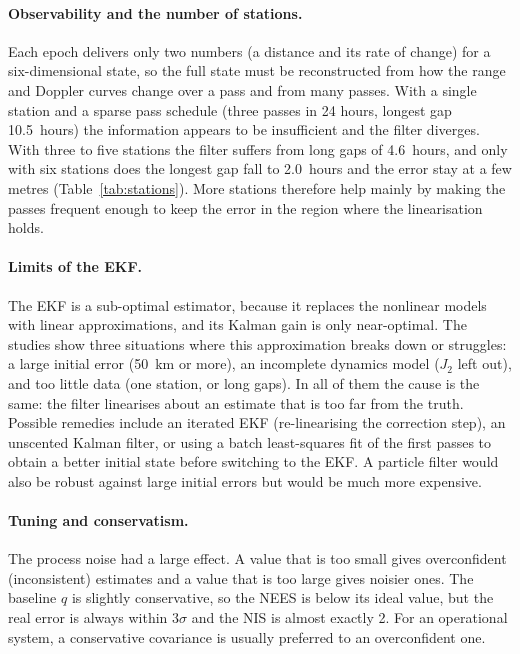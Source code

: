 \documentclass[11pt,a4paper]{article}
\begin{document}
\paragraph{Observability and the number of stations.}
Each epoch delivers only two numbers (a distance and its rate of change) for a six-dimensional state, so the full state must be reconstructed from how the range and Doppler curves change over a pass and from many passes. With a single station and a sparse pass schedule (three passes in 24 hours, longest gap 10.5~hours) the information appears to be insufficient and the filter diverges. With three to five stations the filter suffers from long gaps of 4.6~hours, and only with six stations does the longest gap fall to 2.0~hours and the error stay at a few metres (Table~\ref{tab:stations}). More stations therefore help mainly by making the passes frequent enough to keep the error in the region where the linearisation holds.

\paragraph{Limits of the EKF.}
The EKF is a sub-optimal estimator, because it replaces the nonlinear models with linear approximations, and its Kalman gain is only near-optimal. The studies show three situations where this approximation breaks down or struggles: a large initial error (50~km or more), an incomplete dynamics model ($J_2$ left out), and too little data (one station, or long gaps). In all of them the cause is the same: the filter linearises about an estimate that is too far from the truth. Possible remedies include an iterated EKF (re-linearising the correction step), an unscented Kalman filter, or using a batch least-squares fit of the first passes to obtain a better initial state before switching to the EKF. A particle filter would also be robust against large initial errors but would be much more expensive.

\paragraph{Tuning and conservatism.}
The process noise had a large effect. A value that is too small gives overconfident (inconsistent) estimates and a value that is too large gives noisier ones. The baseline $q$ is slightly conservative, so the NEES is below its ideal value, but the real error is always within $3\sigma$ and the NIS is almost exactly 2. For an operational system, a conservative covariance is usually preferred to an overconfident one.
\end{document}
